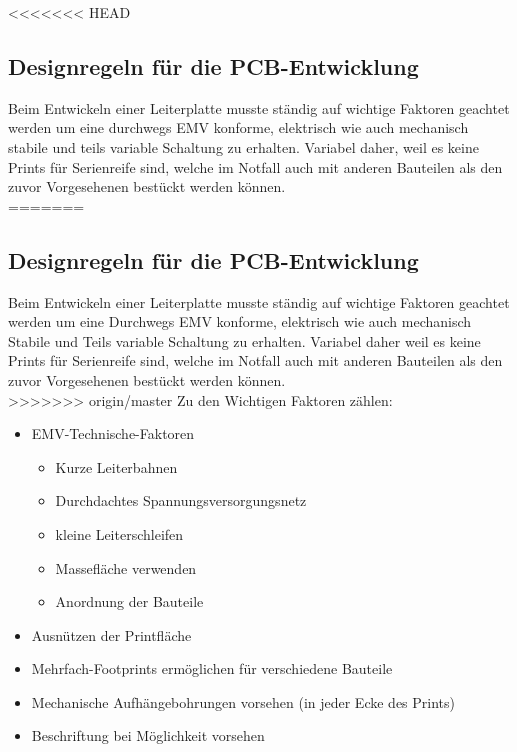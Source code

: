 <<<<<<< HEAD
\subsection{Designregeln für die PCB-Entwicklung}\label{subsec:3.1.2}
Beim Entwickeln einer Leiterplatte musste ständig auf wichtige Faktoren geachtet werden um eine durchwegs EMV konforme, elektrisch wie auch mechanisch stabile und teils variable Schaltung zu erhalten. Variabel daher, weil es keine Prints für Serienreife sind, welche im Notfall auch mit anderen Bauteilen als den zuvor Vorgesehenen bestückt werden können.\\
=======

\subsection{Designregeln für die PCB-Entwicklung}\label{subsec:3.1.2}
Beim Entwickeln einer Leiterplatte musste ständig auf wichtige Faktoren geachtet werden um eine Durchwegs EMV konforme, elektrisch wie auch mechanisch Stabile und Teils variable Schaltung zu erhalten. Variabel daher weil es keine Prints für Serienreife sind, welche im Notfall auch mit anderen Bauteilen als den zuvor Vorgesehenen bestückt werden können.\\
>>>>>>> origin/master
Zu den Wichtigen Faktoren zählen:
\begin{itemize}
	\item EMV-Technische-Faktoren
	\begin{itemize}
		\item Kurze Leiterbahnen
		\item Durchdachtes Spannungsversorgungsnetz
		\item kleine Leiterschleifen
		\item Massefläche verwenden
		\item Anordnung der Bauteile
	\end{itemize}
	\item Ausnützen der Printfläche
	\item Mehrfach-Footprints ermöglichen für verschiedene Bauteile
	\item Mechanische Aufhängebohrungen vorsehen (in jeder Ecke des Prints)
	\item Beschriftung bei Möglichkeit vorsehen
\end{itemize}


